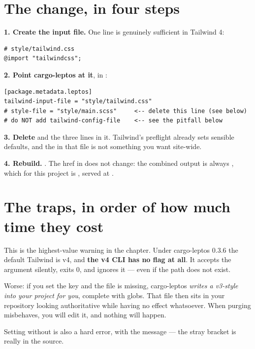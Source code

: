 \section{The change, in four steps}

\begin{runbook}
\textbf{1. Create the input file.} One line is genuinely sufficient in Tailwind 4:
\begin{lstlisting}[style=sh]
# style/tailwind.css
@import "tailwindcss";
\end{lstlisting}

\textbf{2. Point cargo-leptos at it}, in :
\begin{lstlisting}[style=toml]
[package.metadata.leptos]
tailwind-input-file = "style/tailwind.css"
# style-file = "style/main.scss"     <-- delete this line (see below)
# do NOT add tailwind-config-file    <-- see the pitfall below
\end{lstlisting}

\textbf{3. Delete } and the three lines in it. Tailwind's preflight already
sets sensible defaults, and the  in that file is not something you want
site-wide.

\textbf{4. Rebuild.} . The href in  does not change: the
combined output is always , which for this
project is , served at .
\end{runbook}

\section{The traps, in order of how much time they cost}

\begin{pitfall}
This is the highest-value warning in the chapter. Under cargo-leptos 0.3.6 the default Tailwind is
v4, and \textbf{the v4 CLI has no  flag at all}. It accepts the argument silently,
exits 0, and ignores it --- even if the path does not exist.

Worse: if you set the key and the file is missing, cargo-leptos \emph{writes a v3-style
 into your project for you}, complete with  globs. That file
then sits in your repository looking authoritative while having no effect whatsoever. When purging
misbehaves, you will edit it, and nothing will happen.

Setting  without  is also a hard error, with
the message \code{The Cargo.toml `tailwind-input-file` is required when using `tailwind-config-file`]}
--- the stray bracket is really in the source.
\end{pitfall}

